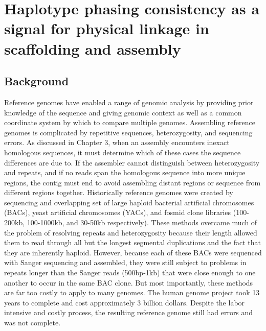 %
\chapter{Haplotype phasing consistency as a signal for physical linkage in scaffolding and assembly}

\ifpdf
    \graphicspath{{Chapter4/Figs/Raster/}{Chapter4/Figs/PDF/}{Chapter4/Figs/}}
\else
    \graphicspath{{Chapter4/Figs/Vector/}{Chapter4/Figs/}}
\fi

\section{Background}
\par{
Reference genomes have enabled a range of genomic analysis by providing prior knowledge of the sequence 
and giving genomic context as well as a common coordinate system by which to compare multiple genomes\cite{1000genomes}\cite{GRCh38}. Assembling reference genomes is complicated by repetitive sequences, heterozygosity, and sequencing errors. As discussed in Chapter 3, when an assembly encounters inexact homologous sequences, it must determine which of these cases the sequence differences are due to. 
If the assembler cannot distinguish between heterozygosity and repeats, and if no reads span the homologous sequence into more unique regions, the contig must end
to avoid assembling distant regions or sequence from different regions together. Historically reference genomes were created by sequencing and overlapping set of large haploid bacterial artificial chromosomes (BACs), yeast artificial chromosomes (YACs), and fosmid clone libraries \cite{human} (100-200kb, 100-1000kb, and 30-50kb respectively). 
These methods overcame much of the problem of resolving repeats and heterozygosity because their length allowed them to read through all but the longest segmental duplications and the fact that they are inherently haploid. However, because each of these BACs were sequenced with Sanger sequencing and assembled, they were still subject to problems in repeats longer than the Sanger reads (500bp-1kb) that were close enough to one another to occur in the same BAC clone. But most importantly, these methods are far too costly to apply to many genomes. The human genome project took 13 years to complete and cost approximately 3 billion dollars\cite{genomeproject}. Despite the labor intensive and costly process, the resulting reference genome still had errors and was not complete\cite{renamegrch38}.
} 

